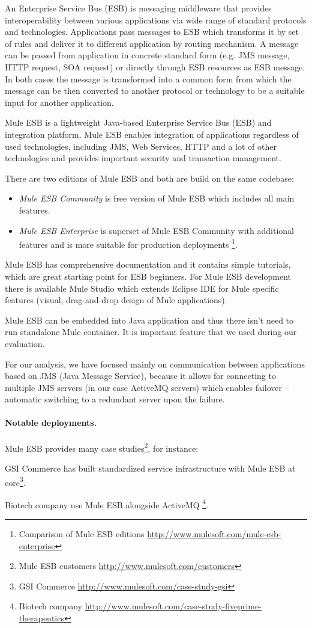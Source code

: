 \documentclass[a4paper]{report}
\begin{document}
An Enterprise Service Bus (ESB) is messaging middleware that provides interoperability between various applications via wide range of standard protocols and technologies. Applications pass messages to ESB which transforms it by set of rules and deliver it to different application by routing mechanism. A message can be passed from application in concrete standard form (e.g. JMS message, HTTP request, SOA request) or directly through ESB resources as ESB message. In both cases the message is transformed into a common form from which the message can be then converted to another protocol or technology to be a suitable input for another application. 

Mule ESB is a lightweight Java-based Enterprise Service Bus (ESB) and integration platform. Mule ESB enables integration of applications regardless of used technologies, including JMS, Web Services, HTTP and a lot of other technologies and provides important security and transaction management.

There are two editions of Mule ESB and both are build on the same codebase:
\begin{itemize}
\item \emph{Mule ESB Community} is free version of Mule ESB which includes all main features.
\item \emph{Mule ESB Enterprise} is superset of Mule ESB Community with additional features and is more suitable for production deployments \footnote{Comparison of Mule ESB editions \url{http://www.mulesoft.com/mule-esb-enterprise}}.
\end{itemize}

Mule ESB has comprehensive documentation and it contains simple tutorials, which are great starting point for ESB beginners. For Mule ESB development there is available Mule Studio which extends Eclipse IDE for Mule specific features (visual, drag-and-drop design of Mule applications).

Mule ESB can be embedded into Java application and thus there isn't need to run standalone Mule container. It is important feature that we used during our evaluation.

For our analysis, we have focused mainly on communication between applications based on JMS (Java Message Service), because it allows for connecting to multiple JMS servers (in our case ActiveMQ servers) which enables failover -- automatic switching to a redundant server upon the failure.

\paragraph{Notable deployments.}
Mule ESB provides many case studies\footnote{Mule ESB customers \url{http://www.mulesoft.com/customers}}, for instance:
\begin{compactitem}
\item GSI Commerce has built standardized service infrastructure with Mule ESB at core\footnote{GSI Commerce \url{http://www.mulesoft.com/case-study-gsi}}.
\item Biotech company use Mule ESB alongside ActiveMQ \footnote{Biotech company \url{http://www.mulesoft.com/case-study-fiveprime-therapeutics}}.
\end{compactitem}
\end{document}
